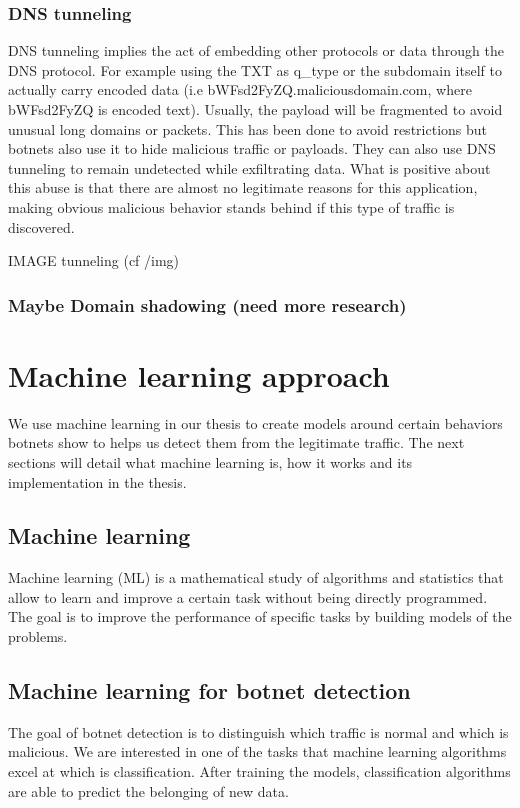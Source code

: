 \subsubsection{DNS tunneling}
DNS tunneling implies the act of embedding other protocols or data through the DNS protocol. For example using the TXT  as q\_type or the subdomain itself to actually carry encoded data (i.e bWFsd2FyZQ.maliciousdomain.com, where bWFsd2FyZQ is encoded text). Usually, the payload will be fragmented to avoid unusual long domains or packets. This has been done to avoid restrictions but botnets also use it to hide malicious traffic or payloads. They can also use DNS tunneling to remain undetected while exfiltrating data. \cite{Botnet1}
What is positive about this abuse is that there are almost no legitimate reasons for this application, making obvious malicious behavior stands behind if this type of traffic is discovered.\cite{tunneling}

IMAGE tunneling (cf /img)


\subsubsection{Maybe Domain shadowing (need more research)}
\cite{review2}\cite{detection8}


\section{Machine learning approach}
We use machine learning in our thesis to create models around certain behaviors botnets show to helps us detect them from the legitimate traffic. The next sections will detail what machine learning is, how it works and its implementation in the thesis.
\subsection{Machine learning}
Machine learning (ML) is a mathematical study of algorithms and statistics that allow to learn and improve a certain task without being directly programmed. The goal is to improve the performance of specific tasks by building models of the problems. \cite{ml-def}

\subsection{Machine learning for botnet detection}
The goal of botnet detection is to distinguish which traffic is normal and which is malicious. We are interested in one of the tasks that machine learning algorithms excel at which is classification. After training the models, classification algorithms are able to predict the belonging of new data.

